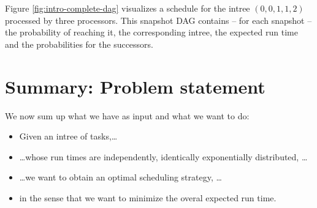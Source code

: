 Figure \ref{fig:intro-complete-dag} visualizes a schedule for the intree $(0,0,1,1,2)$ processed by three processors. This snapshot DAG contains -- for each snapshot -- the probability of reaching it, the corresponding intree, the expected run time and the probabilities for the successors.

\section{Summary: Problem statement}
\label{sec:introduction-aim}

We now sum up what we have as input and what we want to do:
\begin{itemize}
\item Given an intree of tasks,\dots
\item \dots whose run times are independently, identically exponentially distributed, \dots
\item \dots we want to obtain an optimal scheduling strategy, \dots
\item in the sense that we want to minimize the overal expected run time.
\end{itemize}



